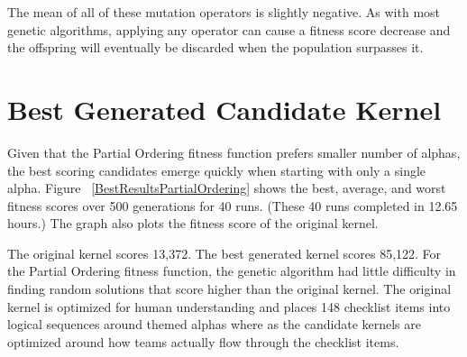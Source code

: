 \documentclass[preprint,12pt,3p]{elsarticle}
\begin{document}
The mean of all of these mutation operators is slightly negative. As with most genetic algorithms, applying any operator can cause a fitness score decrease and the offspring will eventually be discarded when the population surpasses it.




\section{Best Generated Candidate Kernel}

Given that the Partial Ordering fitness function prefers smaller number of alphas, the best scoring candidates emerge quickly when starting with only a single alpha. Figure ~\ref{BestResultsPartialOrdering} shows the best, average, and worst fitness scores over 500 generations for 40 runs. (These 40 runs completed in 12.65 hours.) The graph also plots the fitness score of the original kernel.

The original kernel scores 13,372. The best generated kernel scores 85,122. For the Partial Ordering fitness function, the genetic algorithm had little difficulty in finding random solutions that score higher than the original kernel. The original kernel is optimized for human understanding and places 148 checklist items into logical sequences around themed alphas where as the candidate kernels are optimized around how teams actually flow through the checklist items.
\end{document}
